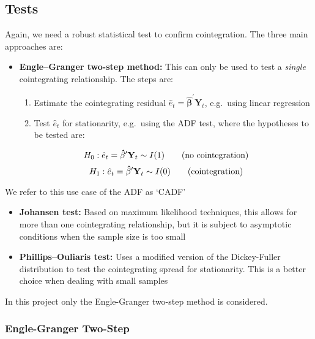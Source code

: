 \documentclass[11pt]{article}
\begin{document}
    \subsection{Tests}\label{tests}
Again, we need a robust statistical test to confirm cointegration. The
three main approaches are:
\begin{itemize}
\item
  \textbf{Engle--Granger two-step method:} This can only be used to test
  a \emph{single} cointegrating relationship. The steps are:
  \begin{enumerate}
  \def\labelenumi{(\roman{enumi})}
  \item
    Estimate the cointegrating residual $\hat{e}_t =
    \mathbf{\hat{\beta}^\prime} \mathbf{Y}_t$, e.g.~using linear
    regression
  \item
    Test \(\hat{e}_t\) for stationarity, e.g.~using the ADF test, where
    the hypotheses to be tested are:
  \end{enumerate}
  \begin{equation}
  H_0 \space :  \space \hat{e}_t = \mathbf{\hat{\beta}^\prime} \mathbf{Y}_t \sim I(1) \qquad \mathrm{(no \text{ } cointegration)}
  \end{equation}
  \begin{equation}
  H_1 \space :  \space \hat{e}_t = \mathbf{\hat{\beta}^\prime} \mathbf{Y}_t \sim I(0) \qquad \mathrm{(cointegration)}
  \end{equation}
\end{itemize}
We refer to this use case of the ADF as `CADF'
\begin{itemize}
\item
  \textbf{Johansen test:} Based on maximum likelihood techniques, this
  allows for more than one cointegrating relationship, but it is subject
  to asymptotic conditions when the sample size is too small
\item
  \textbf{Phillips--Ouliaris test:} Uses a modified version of the
  Dickey-Fuller distribution to test the cointegrating spread for
  stationarity. This is a better choice when dealing with small samples
\end{itemize}
In this project only the Engle-Granger two-step method is considered.

    \subsubsection{Engle-Granger Two-Step}\label{engle-granger-test-implementation}
\end{document}
